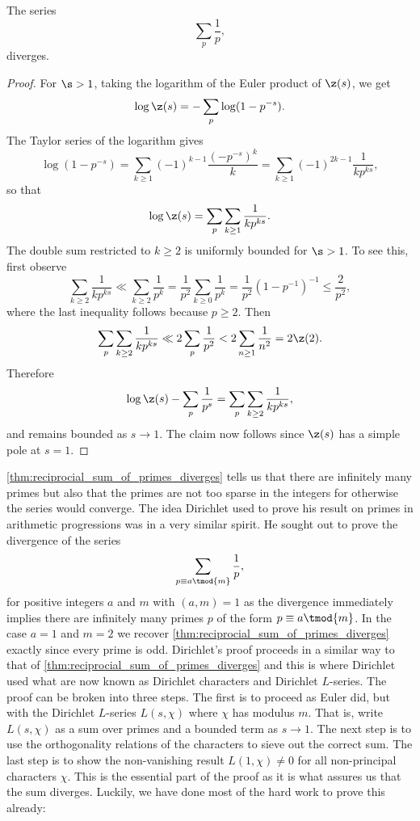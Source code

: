     \begin{theorem}\label{thm:reciprocial_sum_of_primes_diverges}
      The series
      \[
        \sum_{p}\frac{1}{p},
      \]
      diverges.
    \end{theorem}
    \begin{proof}
      For $\s > 1$, taking the logarithm of the Euler product of $\z(s)$, we get
      \[
        \log\z(s) = -\sum_{p}\log(1-p^{-s}).
      \]
      The Taylor series of the logarithm gives
      \[
        \log(1-p^{-s}) = \sum_{k \ge 1}(-1)^{k-1}\frac{(-p^{-s})^{k}}{k} = \sum_{k \ge 1}(-1)^{2k-1}\frac{1}{kp^{ks}},
      \]
      so that
      \[
        \log\z(s) = \sum_{p}\sum_{k \ge 1}\frac{1}{kp^{ks}}.
      \]
      The double sum restricted to $k \ge 2$ is uniformly bounded for $\s > 1$. To see this, first observe
      \[
        \sum_{k \ge 2}\frac{1}{kp^{ks}} \ll \sum_{k \ge 2}\frac{1}{p^{k}} = \frac{1}{p^{2}}\sum_{k \ge 0}\frac{1}{p^{k}} = \frac{1}{p^{2}}(1-p^{-1})^{-1} \le \frac{2}{p^{2}},
      \]
      where the last inequality follows because $p \ge 2$. Then
      \[
       \sum_{p}\sum_{k \ge 2}\frac{1}{kp^{ks}} \ll 2\sum_{p}\frac{1}{p^{2}} < 2\sum_{n \ge 1}\frac{1}{n^{2}} = 2\z(2).
      \]
      Therefore
      \[
        \log\z(s)-\sum_{p}\frac{1}{p^{s}} = \sum_{p}\sum_{k \ge 2}\frac{1}{kp^{ks}},
      \]
      and remains bounded as $s \to 1$. The claim now follows since $\z(s)$ has a simple pole at $s = 1$.
    \end{proof}

    \cref{thm:reciprocial_sum_of_primes_diverges} tells us that there are infinitely many primes but also that the primes are not too sparse in the integers for otherwise the series would converge. The idea Dirichlet used to prove his result on primes in arithmetic progressions was in a very similar spirit. He sought out to prove the divergence of the series
    \[
      \sum_{p \equiv a \tmod{m}}\frac{1}{p},
    \]
    for positive integers $a$ and $m$ with $(a,m) = 1$ as the divergence immediately implies there are infinitely many primes $p$ of the form $p \equiv a \tmod{m}$. In the case $a = 1$ and $m = 2$ we recover \cref{thm:reciprocial_sum_of_primes_diverges} exactly since every prime is odd. Dirichlet's proof proceeds in a similar way to that of \cref{thm:reciprocial_sum_of_primes_diverges} and this is where Dirichlet used what are now known as Dirichlet characters and Dirichlet $L$-series. The proof can be broken into three steps. The first is to proceed as Euler did, but with the Dirichlet $L$-series $L(s,\chi)$ where $\chi$ has modulus $m$. That is, write $L(s,\chi)$ as a sum over primes and a bounded term as $s \to 1$. The next step is to use the orthogonality relations of the characters to sieve out the correct sum. The last step is to show the non-vanishing result $L(1,\chi) \neq 0$ for all non-principal characters $\chi$. This is the essential part of the proof as it is what assures us that the sum diverges. Luckily, we have done most of the hard work to prove this already:


